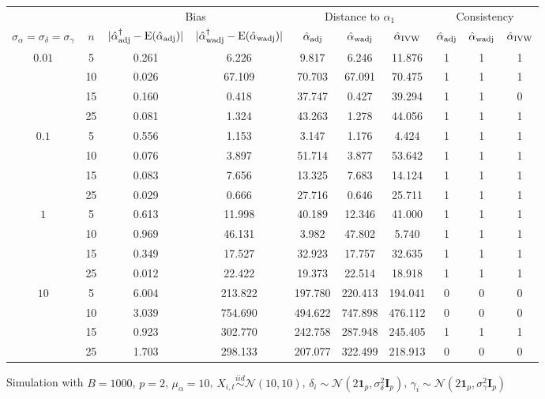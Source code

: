 \documentclass[11pt]{article}
\newcommand{\simiid}{\stackrel{iid}{\sim}} %
\def\normal#1#2{\mathcal{N}(#1,#2)} %
\def\E#1{\mathrm{E}(#1)} %
\theoremstyle{definition}
\begin{document}
\begin{sidewaysfigure}
 \caption{Simulation  with $B = 1000$, $p = 2$, $\mu_{\alpha}=10$, $X_{i,t} \simiid \normal{10}{10}$, $\delta_i \sim \normal{2\mathbf{1}_p}{\sigma^2_{\delta}\mathbf{I}_p}$, $\gamma_i \sim \normal{2\mathbf{1}_p}{\sigma^2_{\gamma}\mathbf{I}_p}$} \vspace{.2cm}
\centering
\begin{tabular}{cc|cc|ccc|ccc}
&  & \multicolumn{2}{c|}{Bias} & \multicolumn{3}{c|}{Distance to $\alpha_1$} & \multicolumn{3}{c}{Consistency} \\ 
$\sigma_{\alpha} = \sigma_{\delta}=\sigma_{\gamma}$ & $n$ & $|\hat{\alpha}_{\rm adj}^{\dagger}-\E{\hat{\alpha}_{\rm adj}}|$ & $|\hat{\alpha}_{\rm wadj}^{\dagger}-\E{\hat{\alpha}_{\rm wadj}}|$ & $\hat{\alpha}_{\rm adj}$ & $\hat{\alpha}_{\rm wadj}$ & $\hat{\alpha}_{\rm IVW}$ & $\hat{\alpha}_{\rm adj}$ & $\hat{\alpha}_{\rm wadj}$ & $\hat{\alpha}_{\rm IVW}$ \\[.3cm] 
\multirow{4}{*}{$0.01$}&  5 & 0.261 & 6.226 & 9.817 & 6.246 & 11.876 & 1  & 1  & 1  \\ 
  &  10 & 0.026 & 67.109 & 70.703 & 67.091 & 70.475 & 1  & 1  & 1  \\ 
  & 15 & 0.160 & 0.418 & 37.747 & 0.427 & 39.294 & 1  & 1  & 0  \\ 
  & 25 & 0.081 & 1.324 & 43.263 & 1.278 & 44.056 & 1  & 1  & 1  \\[.3cm] 
 \multirow{4}{*}{$0.1$} & 5 & 0.556 & 1.153 & 3.147 & 1.176 & 4.424 & 1  & 1  & 1  \\ 
  & 10 & 0.076 & 3.897 & 51.714 & 3.877 & 53.642 & 1  & 1  & 1  \\ 
  & 15 & 0.083 & 7.656 & 13.325 & 7.683 & 14.124 & 1  & 1  & 1  \\ 
  & 25 & 0.029 & 0.666 & 27.716 & 0.646 & 25.711 & 1  & 1  & 1  \\[.3cm] 
 \multirow{4}{*}{$1$} & 5 & 0.613 & 11.998 & 40.189 & 12.346 & 41.000  & 1  & 1  & 1  \\ 
  & 10 & 0.969 & 46.131 & 3.982 & 47.802 & 5.740 & 1  & 1  & 1  \\ 
  & 15 & 0.349 & 17.527 & 32.923 & 17.757 & 32.635 & 1  & 1  & 1  \\ 
  & 25 & 0.012 & 22.422 & 19.373 & 22.514 & 18.918 & 1  & 1  & 1  \\[.3cm] 
 \multirow{4}{*}{$10$} & 5 & 6.004 & 213.822 & 197.780 & 220.413 & 194.041 & 0  & 0  & 0  \\ 
  & 10 & 3.039 & 754.690 & 494.622 & 747.898 & 476.112 & 0  & 0  & 0  \\ 
  & 15 & 0.923 & 302.770 & 242.758 & 287.948 & 245.405 & 1  & 1  & 1  \\ 
  & 25 & 1.703 & 298.133 & 207.077 & 322.499 & 218.913 & 0  & 0  & 0  \\ 
\end{tabular}
\end{sidewaysfigure}
\end{document}
